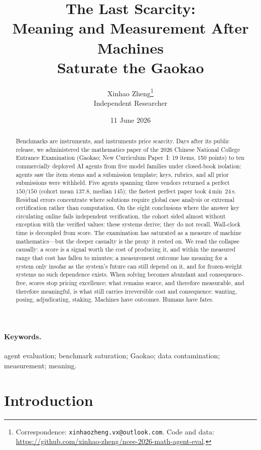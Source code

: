 \documentclass[11pt]{article}
\title{\textbf{The Last Scarcity:\\[3pt]
  Meaning and Measurement After Machines\\
  Saturate the Gaokao}}
\author{%
  Xinhao Zheng\thanks{Correspondence: \texttt{xinhaozheng.vx@outlook.com}.
    Code and data:
    \url{https://github.com/xinhao-zheng/ncee-2026-math-agent-eval}.}\\[2pt]
  \small Independent Researcher}
\date{11 June 2026}
\theoremstyle{plain}
\begin{document}
\maketitle

\begin{abstract}
\noindent
Benchmarks are instruments, and instruments price scarcity. Days after
its public release, we administered the mathematics paper of the 2026
Chinese National College Entrance Examination (Gaokao; New Curriculum
Paper~I: 19 items, 150 points) to ten commercially deployed AI agents
from five model families under closed-book isolation: agents saw the item
stems and a submission template; keys, rubrics, and all prior submissions
were withheld. Five agents spanning three vendors returned a
perfect $150/150$ (cohort mean $137.8$, median $145$); the fastest perfect
paper took $4$\,min~$24$\,s. Residual errors concentrate where solutions
require global case analysis or extremal certification rather than
computation. On the eight conclusions where the answer key circulating
online fails independent verification, the cohort sided almost without
exception with the verified values: these systems derive; they do not
recall. Wall-clock time is decoupled from score. The
examination has saturated as a measure of machine mathematics---but the
deeper casualty is the proxy it rested on. We read the collapse causally:
a score is a signal worth the cost of producing it, and within the
measured range that cost has fallen to minutes; a measurement outcome has
meaning for a system only insofar as the system's future can still depend
on it, and for frozen-weight systems no such dependence exists. When
solving becomes abundant and consequence-free, scores stop pricing
excellence; what remains scarce, and therefore measurable, and therefore
meaningful, is what still carries irreversible cost and consequence:
wanting, posing, adjudicating, staking. Machines have outcomes. Humans
have fates.
\end{abstract}

\paragraph*{Keywords.} agent evaluation; benchmark saturation; Gaokao;
data contamination; measurement; meaning.

\section{Introduction}
\end{document}

